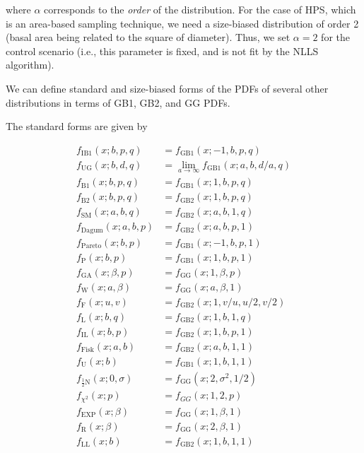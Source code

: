 where $\alpha$ corresponds to the \emph{order} of the distribution.
For the case of HPS, which is an area-based sampling technique, we need a size-biased distribution of order 2 (basal area being related to the square of diameter). 
Thus, we set $\alpha=2$ for the control scenario (i.e., this parameter
is fixed, and is not fit by the NLLS algorithm).

We can define standard and size-biased forms of the PDFs of several other distributions in terms of GB1, GB2, and GG PDFs.

The standard forms are given by
{\small

  \begin{align}
  f_{\text{IB1}}(x; b, p, q) &= f_{\text{GB1}}(x; -1, b, p, q) \\
  f_{\text{UG}}(x; b, d, q) &= \lim_{a \to \infty} f_{\text{GB1}}(x; a, b, d/a, q) \\
f_{\text{B1}}(x; b, p, q) &= f_{\text{GB1}}(x; 1, b, p, q) \\
f_{\text{B2}}(x; b, p, q) &= f_{\text{GB2}}(x; 1, b, p, q) \\
f_{\text{SM}}(x; a, b, q) &= f_{\text{GB2}}(x; a, b, 1, q) \\
f_{\text{Dagum}}(x; a, b, p) &= f_{\text{GB2}}(x; a, b, p, 1) \\
f_{\text{Pareto}}(x; b, p) &= f_{\text{GB1}}(x; -1, b, p, 1) \\
f_{\text{P}}(x; b, p) &= f_{\text{GB1}}(x; 1, b, p, 1) \\
f_{\text{GA}}(x; \beta, p) &= f_{\text{GG}}(x; 1, \beta, p) \\
f_{\text{W}}(x; a, \beta) &= f_{\text{GG}}(x; a, \beta, 1) \\
f_{\text{F}}(x; u, v) &= f_{\text{GB2}}(x; 1, v/u, u/2, v/2) \\
f_{\text{L}}(x; b, q) &= f_{\text{GB2}}(x; 1, b, 1, q) \\
f_{\text{IL}}(x; b, p) &= f_{\text{GB2}}(x; 1, b, p, 1) \\
f_{\text{Fisk}}(x; a, b) &= f_{\text{GB2}}(x; a, b, 1, 1) \\
f_{\text{U}}(x; b) &= f_{\text{GB1}}(x; 1, b, 1, 1) \\
f_{\tfrac{1}{2}\text{N}}(x; 0, \sigma) &= f_{\text{GG}}(x; 2, \sigma^2, 1/2) \\
f_{\chi^2}(x; p) &= f_{GG}(x; 1, 2, p) \\
f_{\text{EXP}}(x; \beta) &= f_{\text{GG}}(x; 1, \beta, 1) \\
f_{\text{R}}(x; \beta) &= f_{\text{GG}}(x; 2, \beta, 1) \\
f_{\text{LL}}(x; b) &= f_{\text{GB2}}(x; 1, b, 1, 1)
\end{align}
}%

